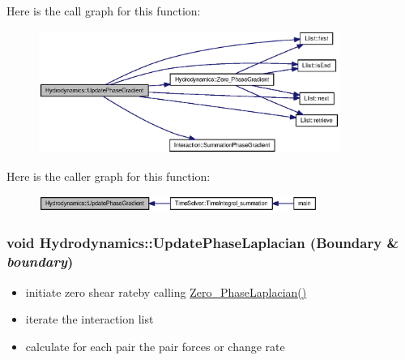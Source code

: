 Here is the call graph for this function:\nopagebreak
\begin{figure}[H]
\begin{center}
\leavevmode
\includegraphics[width=278pt]{classHydrodynamics_939e9b2ec26b3e4a2eaf2683e5f0343d_cgraph}
\end{center}
\end{figure}


Here is the caller graph for this function:\nopagebreak
\begin{figure}[H]
\begin{center}
\leavevmode
\includegraphics[width=258pt]{classHydrodynamics_939e9b2ec26b3e4a2eaf2683e5f0343d_icgraph}
\end{center}
\end{figure}
\hypertarget{classHydrodynamics_dbbe86fd4eac49912a9ffb5e284883ee}{
\subsubsection[{UpdatePhaseLaplacian}]{\setlength{\rightskip}{0pt plus 5cm}void Hydrodynamics::UpdatePhaseLaplacian ({\bf Boundary} \& {\em boundary})}}
\label{classHydrodynamics_dbbe86fd4eac49912a9ffb5e284883ee}




\begin{itemize}
\item initiate zero shear rateby calling \hyperlink{classHydrodynamics_d1c5fd5b500eacb886a72f2dab13e91b}{Zero\_\-PhaseLaplacian()}\end{itemize}


\begin{itemize}
\item iterate the interaction list\end{itemize}


\begin{itemize}
\item calculate for each pair the pair forces or change rate \end{itemize}


